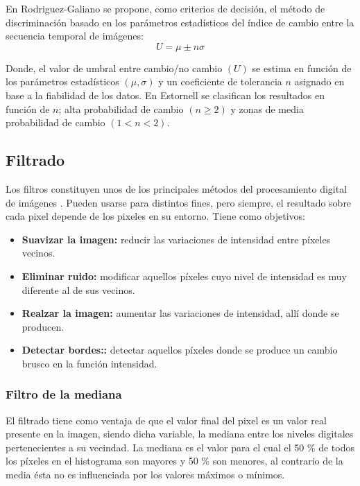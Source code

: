 En Rodriguez-Galiano \cite{rodriguez2010analisis} se propone, como criterios de decisi\'on, el m\'etodo de discriminaci\'on basado en los par\'ametros estad\'isticos del \'indice de cambio entre la secuencia temporal de im\'agenes:
\begin{equation}
U=\mu \pm n\sigma
\end{equation}

Donde, el valor de umbral entre cambio/no cambio $ (U) $ se estima en funci\'on de los par\'ametros estad\'isticos $ (\mu, \sigma) $ y un coeficiente de tolerancia $ n $ asignado en base a la fiabilidad de los datos. En Estornell \cite{estornell2004analisis} se clasifican los resultados en funci\'on de $ n $; alta probabilidad de cambio $ (n \geq 2) $ y
zonas de media probabilidad de cambio $ (1 < n < 2) $.

\subsection{Filtrado}
Los filtros constituyen unos de los principales m\'etodos del procesamiento digital de im\'agenes . Pueden usarse para distintos fines, pero siempre, el resultado sobre cada pixel depende de los pixeles en su entorno. Tiene como objetivos: 
	\begin{itemize}
		\item \textbf{Suavizar la imagen:} reducir las variaciones de intensidad entre p\'ixeles vecinos.
		\item \textbf{Eliminar ruido:}  modificar aquellos p\'ixeles cuyo nivel de intensidad es muy diferente al de sus vecinos.
		\item \textbf{Realzar la imagen:} aumentar las variaciones de intensidad, all\'i donde se producen.
		\item \textbf{Detectar bordes::} detectar aquellos p\'ixeles donde se produce un cambio brusco en la funci\'on intensidad.	
	\end{itemize}
\subsubsection{Filtro de la mediana}\label{subsec:filMediana}
El filtrado tiene como ventaja de que el valor final del pixel es un valor real presente en la imagen, siendo dicha variable, la mediana entre los niveles digitales pertenecientes a su vecindad. La mediana es el valor para el cual el 50 \% de todos los p\'ixeles en el histograma son mayores y 50 \% son menores, al contrario de la media \'esta no es influenciada por los valores m\'aximos o m\'inimos\cite{mehl1997fundamentos}.

